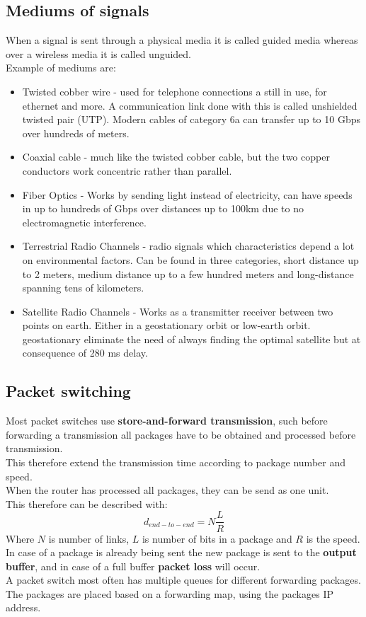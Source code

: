 \documentclass[12pt, a4paper]{article}
\begin{document}
		\subsection{Mediums of signals}
			When a signal is sent through a physical media it is called guided media whereas over a wireless media it is called unguided.\\
			Example of mediums are:
			\begin{itemize}
				\item Twisted cobber wire - used for telephone connections a still in use, for ethernet and more. A communication link done with this is called unshielded twisted pair (UTP). Modern cables of category 6a can transfer up to 10 Gbps over hundreds of meters.
				\item Coaxial cable - much like the twisted cobber cable, but the two copper conductors work concentric rather than parallel.
				\item Fiber Optics - Works by sending light instead of electricity, can have speeds in up to hundreds of Gbps over distances up to 100km due to no electromagnetic interference.
				\item Terrestrial Radio Channels - radio signals which characteristics depend a lot on environmental factors. Can be found in three categories, short distance up to 2 meters, medium distance up to a few hundred meters and long-distance spanning tens of kilometers.
				\item Satellite Radio Channels - Works as a transmitter receiver between two points on earth. Either in a geostationary orbit or low-earth orbit. geostationary eliminate the need of always finding the optimal satellite but at consequence of 280 ms delay.
			\end{itemize}
		\subsection{Packet switching}
			Most packet switches use \textbf{store-and-forward transmission}, such before forwarding a transmission all packages have to be obtained and processed before transmission.\\
			This therefore extend the transmission time according to package number and speed. \\
			When the router has processed all packages, they can be send as one unit.\\
			This therefore can be described with:
			$$d_{end-to-end}=N\frac{L}{R}$$
			Where $N$ is number of links, $L$ is number of bits in a package and $R$ is the speed.\\[4mm]
			In case of a package is already being sent the new package is sent to the \textbf{output buffer}, and in case of a full buffer \textbf{packet loss} will occur.\\
			A packet switch most often has multiple queues for different forwarding packages. The packages are placed based on a forwarding map, using the packages IP address.
\end{document}
